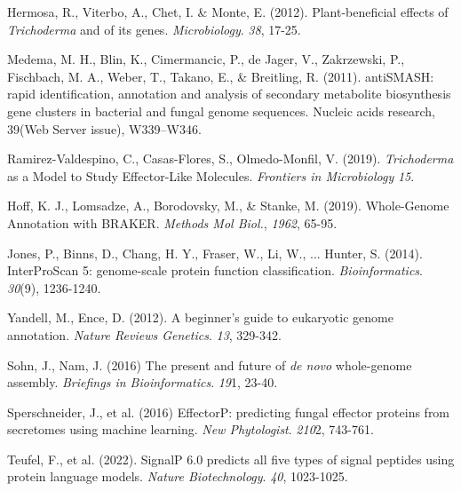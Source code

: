 \documentclass[12pt]{article}
\begin{document}
\begin{thebibliography}{99}
 Hermosa, R., Viterbo, A., Chet, I. \& Monte,
  E. (2012). Plant-beneficial effects of \textit{Trichoderma} and of
  its genes. \textit{Microbiology}. \textit{38},
  17-25. 

 Medema, M. H., Blin, K., Cimermancic, P., de
  Jager, V., Zakrzewski, P., Fischbach, M. A., Weber, T., Takano,
  E., \& Breitling, R. (2011). antiSMASH: rapid identification,
  annotation and analysis of secondary metabolite biosynthesis
  gene clusters in bacterial and fungal genome sequences. Nucleic
  acids research, 39(Web Server issue),
  W339–W346.

 Ramirez-Valdespino, C., Casas-Flores, S.,
  Olmedo-Monfil, V. (2019). \textit{Trichoderma} as a Model to Study
  Effector-Like Molecules. \textit{Frontiers in Microbiology} \textit{15}.

 Hoff, K. J., Lomsadze, A., Borodovsky, M., \&
  Stanke, M. (2019). Whole-Genome Annotation with
  BRAKER. \textit{Methods Mol Biol.}, \textit{1962}, 65-95.

 Jones, P., Binns, D., Chang, H. Y., Fraser,
  W., Li, W., ... Hunter, S. (2014). InterProScan 5: genome-scale
  protein function
  classification. \textit{Bioinformatics}. \textit{30}(9),
  1236-1240.

 Yandell, M., Ence, D. (2012). A beginner's
  guide to eukaryotic genome annotation. \textit{Nature Reviews
    Genetics}. \textit{13}, 329-342.
  
 Sohn, J., Nam, J. (2016) The present and future of
  \textit{de novo} whole-genome assembly. \textit{Briefings in
    Bioinformatics}. \textit{19}1, 23-40.

 Sperschneider, J., et al. (2016) EffectorP:
  predicting fungal effector proteins from secretomes using machine
  learning. \textit{New Phytologist}. \textit{210}2, 743-761.

 Teufel, F., et al. (2022). SignalP 6.0 predicts all
  five types of signal peptides using protein language
  models. \textit{Nature Biotechnology}. \textit{40}, 1023-1025.
  
\end{thebibliography}
\end{document}
